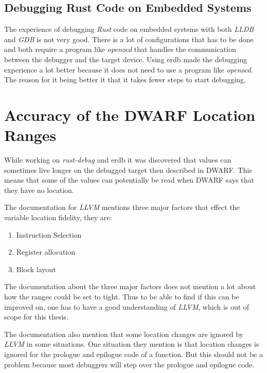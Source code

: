 \subsection{Debugging Rust Code on Embedded Systems}
The experience of debugging \emph{Rust} code on embedded systems with both \emph{LLDB} and \emph{GDB} is not very good.
There is a lot of configurations that has to be done and both require a program like \emph{openocd} that handles the communication between the debugger and the target device.
Using \gls{erdb} made the debugging experience a lot better because it does not need to use a program like \emph{openocd}.
The reason for it being better it that it takes fewer steps to start debugging.


\section{Accuracy of the \gls{DWARF} Location Ranges}\label{section:loc-ranges}
While working on \emph{rust-debug} and \gls{erdb} it was discovered that values can sometimes live longer on the debugged target then described in \gls{DWARF}.
This means that some of the values can potentially be read when \gls{DWARF} says that they have no location.


The documentation for \emph{LLVM} \cite{llvm-dbs} mentions three major factors that effect the variable location fidelity, they are:

\begin{enumerate}
  \item Instruction Selection
  \item Register allocation
  \item Block layout
\end{enumerate}

The documentation about the three major factors does not mention a lot about how the ranges could be set to tight.
Thus to be able to find if this can be improved on, one has to have a good understanding of \emph{LLVM}, which is out of scope for this thesis.


The documentation also mention that some location changes are ignored by \emph{LLVM} in some situations.
One situation they mention is that location changes is ignored for the prologue and epilogue code of a function.
But this should not be a problem because most debuggers will step over the prologue and epilogue code.


